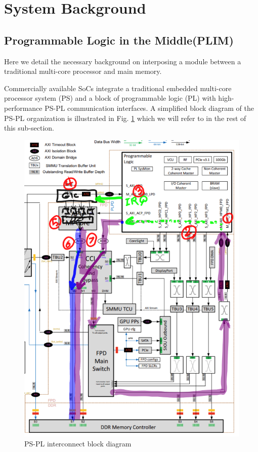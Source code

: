 \section{System Background}
\subsection{Programmable Logic in the Middle(PLIM)}
    Here we detail the necessary background on interposing a module between a traditional multi-core processor and main memory.

    Commercially available SoCs integrate a traditional embedded multi-core processor system (PS) and a block of programmable logic (PL) with high-performance PS-PL communication interfaces. A simplified block diagram of the PS-PL organization is  illustrated in Fig. \ref{fig:PS-PL-diagram} which we will refer to in the rest of this sub-section.
\begin{figure}[t]
\includegraphics[scale=0.4]{images/ps-pl-interconnect.png}
\caption{PS-PL interconnect block diagram}
\label{fig:PS-PL-diagram}
\end{figure}

